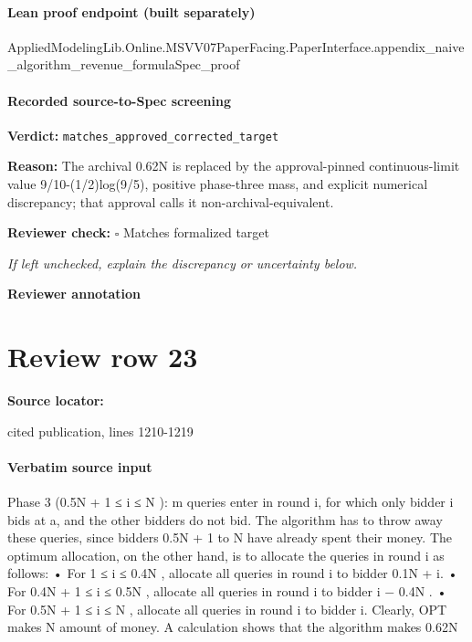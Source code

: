 \documentclass[10pt]{article}
\newcommand{\reviewerbox}{%
  \par\noindent\fbox{\parbox{0.96\linewidth}{\rule{0pt}{0.38in}}}\par
}
\newcommand{\reviewmatch}[1]{%
  \par\noindent\textbf{Reviewer check:} $\square$\; #1\par
  \noindent\emph{If left unchecked, explain the discrepancy or uncertainty below.}\par
}
\begin{document}
\paragraph{Lean proof endpoint (built separately)}\begin{ReviewVerbatim}
AppliedModelingLib.Online.MSVV07PaperFacing.PaperInterface.appendix_naive_algorithm_revenue_formulaSpec_proof
\end{ReviewVerbatim}

\paragraph{Recorded source-to-Spec screening}
\textbf{Verdict:} \texttt{matches\_approved\_corrected\_target}
\\
{\raggedright
\textbf{Reason:} The archival 0.\allowbreak{}62N is replaced by the approval-\allowbreak{}pinned continuous-\allowbreak{}limit value 9/\allowbreak{}10-\allowbreak{}(1/\allowbreak{}2)log(9/\allowbreak{}5), positive phase-\allowbreak{}three mass, and explicit numerical discrepancy;\allowbreak{} that approval calls it non-\allowbreak{}archival-\allowbreak{}equivalent.\allowbreak{}
\par}
\reviewmatch{Matches formalized target}
\noindent\textbf{Reviewer annotation}\par
\reviewerbox
\clearpage
\hypertarget{source-claim-257b9be0bb57b168}{}
\section*{Review row 23}
\textbf{Source locator:} {\footnotesize\raggedright cited publication, lines 1210-\allowbreak{}1219\par}
\paragraph{Verbatim source input}
\begin{ReviewVerbatim}
Phase 3 (0.5N + 1 ≤ i ≤ N ): m queries enter in round i, for which only bidder i bids at a,
and the other bidders do not bid.
The algorithm has to throw away these queries, since bidders 0.5N + 1 to N have already spent
their money.
The optimum allocation, on the other hand, is to allocate the queries in round i as follows:
• For 1 ≤ i ≤ 0.4N , allocate all queries in round i to bidder 0.1N + i.
• For 0.4N + 1 ≤ i ≤ 0.5N , allocate all queries in round i to bidder i − 0.4N .
• For 0.5N + 1 ≤ i ≤ N , allocate all queries in round i to bidder i.
Clearly, OPT makes N amount of money. A calculation shows that the algorithm makes 0.62N
\end{ReviewVerbatim}
\end{document}
